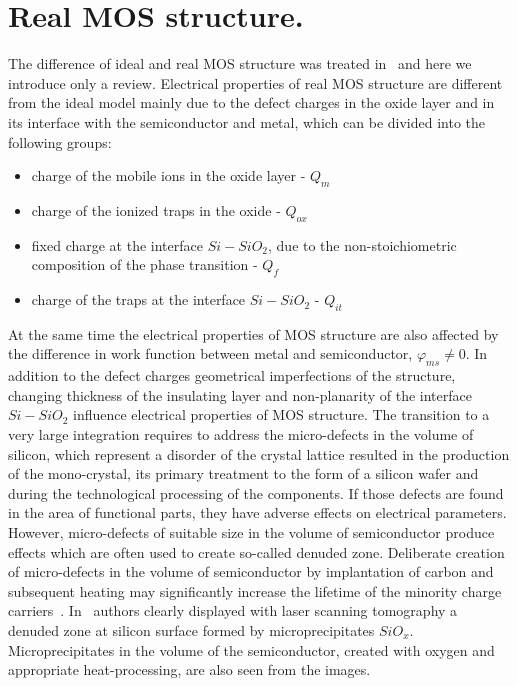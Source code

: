 \section{Real MOS structure.}

The difference of ideal and real MOS structure was treated
in~\cite{1.12} and here we introduce only a review. Electrical
properties of real MOS structure are different from the ideal model
mainly due to the defect charges in the oxide layer and in its
interface with the semiconductor and metal, which can be divided into
the following groups:

\begin{itemize}
\item charge of the mobile ions in the oxide layer - $Q_{m}$
\item charge of the ionized traps in the oxide - $Q_{ox}$
\item fixed charge at the interface $Si-SiO_2$, due to the
  non-stoichiometric composition of the phase transition - $Q_f$
\item charge of the traps at the interface $Si-SiO_2$ - $Q_{it}$
\end{itemize}

\par At the same time the electrical properties of MOS structure are
also affected by the difference in work function between metal and
semiconductor, $\varphi_{ms}\neq{0}$. In addition to the defect
charges geometrical imperfections of the structure, changing thickness
of the insulating layer and non-planarity of the interface $Si-SiO_2$
influence electrical properties of MOS structure. The transition to a
very large integration requires to address the micro-defects in the
volume of silicon, which represent a disorder of the crystal lattice
resulted in the production of the mono-crystal, its primary treatment
to the form of a silicon wafer and during the technological processing
of the components. If those defects are found in the area of
functional parts, they have adverse effects on electrical
parameters. However, micro-defects of suitable size in the volume of
semiconductor produce effects which are often used to create so-called
denuded zone. Deliberate creation of micro-defects in the volume of
semiconductor by implantation of carbon and subsequent heating may
significantly increase the lifetime of the minority charge
carriers~\cite{1.13}. In~\cite{1.14} authors clearly displayed with
laser scanning tomography a denuded zone at silicon surface formed by
microprecipitates $SiO_x$. Microprecipitates in the volume of the
semiconductor, created with oxygen and appropriate heat-processing,
are also seen from the images.

